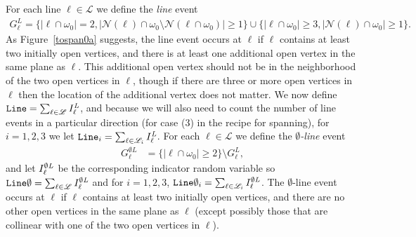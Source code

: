 \documentclass{amsart}
\newcommand{\abs}[1]{\left|#1\right|}
\newcommand{\Lfoo}{I^{\text{\em L}}}
\newcommand{\OL}{I^{\emptyset\text{\em L}}}
\newcommand{\lin}{\operatorname{\tt Line}}
\newcommand{\oline}{\operatorname{\tt  Line\emptyset}}
\newcommand{\event}{G}
\numberwithin{equation}{section}
\newcommand{\lineset}{\mathscr{L}}
\newcommand{\Ln}{\ell}
\theoremstyle{definition}
\theoremstyle{remark}
\begin{document}
For each line $\Ln\in \lineset$ we define the {\em line} event
\begin{align*}
\event^{L}_\Ln = \{ \abs{\Ln \cap \omega_0} =2, \abs{\mathcal{N}(\Ln)\cap \omega_0\setminus \mathcal{N}(\Ln \cap \omega_0)}\geq 1 \} \cup \{ \abs{\Ln \cap \omega_0} \geq 3, \abs{\mathcal{N}(\Ln)\cap \omega_0}\geq 1 \}.
\end{align*}
As Figure~\ref{tospan0a} suggests, the line event occurs at $\Ln$ if $\Ln$ contains at least two initially open vertices, and there is at least one additional open vertex in the same plane as $\Ln$.  This additional open vertex should not be in the neighborhood of the two open vertices in $\Ln$, though if there are three or more open vertices in $\Ln$ then the location of the additional vertex does not matter.  We now define $\lin = \sum_{\Ln \in \lineset} \Lfoo_\Ln$, and because we will also need to count the number of line events in a particular direction (for case (3) in the recipe for spanning), for $i=1,2,3$ we let $\lin_i = \sum_{\Ln \in \lineset_i} \Lfoo_\Ln$.  For each $\Ln \in \lineset$ we define the {\em $\emptyset$-line} event 
\begin{align*}
\event^{\emptyset  L}_\Ln &= \{ \abs{\Ln \cap \omega_0} \geq 2\} \setminus \event^{L}_\Ln,
\end{align*}
and let $\OL_\Ln$ be the corresponding indicator random variable so $\oline = \sum_{\Ln \in \lineset} \OL_\Ln$ and for $i=1,2,3$,  $\oline_i = \sum_{\Ln \in \lineset_i} \OL_\Ln$.  The $\emptyset$-line event occurs at $\Ln$ if $\Ln$ contains at least two initially open vertices, and there are no other open vertices in the same plane as $\Ln$ (except possibly those that are collinear with one of the two open vertices in $\Ln$).
\end{document}
